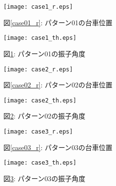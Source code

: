 \begin{figure}[htbp]
    \begin{minipage}{0.5\hsize}
        \begin{center}
            \texttt{[image: case1\_r.eps]}
            \caption{図\ref{case01_r}: パターン01の台車位置}
            \label{case01_r}
        \end{center}
    \end{minipage}
    \begin{minipage}{0.5\hsize}
        \begin{center}
            \texttt{[image: case1\_th.eps]}
            \caption{図\ref{case01_th}: パターン01の振子角度}
            \label{case01_th}
        \end{center}
    \end{minipage}
\end{figure}

\begin{figure}[htbp]
    \begin{minipage}{0.5\hsize}
        \begin{center}
            \texttt{[image: case2\_r.eps]}
            \caption{図\ref{case02_r}: パターン02の台車位置}
            \label{case02_r}
        \end{center}
    \end{minipage}
    \begin{minipage}{0.5\hsize}
        \begin{center}
            \texttt{[image: case2\_th.eps]}
            \caption{図\ref{case02_th}: パターン02の振子角度}
            \label{case02_th}
        \end{center}
    \end{minipage}
\end{figure}

\begin{figure}[htbp]
    \begin{minipage}{0.5\hsize}
        \begin{center}
            \texttt{[image: case3\_r.eps]}
            \caption{図\ref{case03_r}: パターン03の台車位置}
            \label{case03_r}
        \end{center}
    \end{minipage}
    \begin{minipage}{0.5\hsize}
        \begin{center}
            \texttt{[image: case3\_th.eps]}
            \caption{図\ref{case03_th}: パターン03の振子角度}
            \label{case03_th}
        \end{center}
    \end{minipage}
\end{figure}

